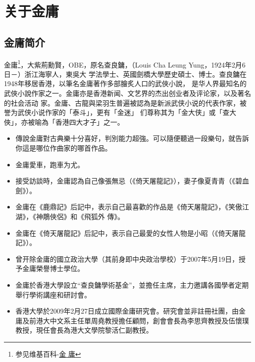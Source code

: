 \chapter{关于金庸}
\label{sec:appendixname}

\section{金庸简介}

金庸\footnote{参见维基百科-\href{http://zh.wikipedia.org/wiki/\%E9\%87\%91\%E5\%BA\%B8}{金
      庸}}，大紫荊勳賢，OBE，原名查良鏞，（Louis Cha Leung Yung，1924年2月6日－）浙江海寧人，東吳大
  学法學士、英國劍橋大學歷史碩士、博士。查良鏞在1948年移居香港，以筆名金庸著作多部膾炙人口的武俠小說，
  是华人界最知名的武俠小說作家之一。金庸亦是香港新闻、文艺界的杰出创业者及评论家，以及著名的社会活动
  家。金庸、古龍與梁羽生普遍被認為是新派武侠小说的代表作家，被誉为武侠小说作家的「泰斗」，更有「金迷」
  们尊称其为「金大侠」或「查大俠」，亦被喻為「香港四大才子」之一\cite{jinyongcn}。
\begin{itemize}
\item 傳說金庸對古典樂十分喜好，判別能力超強。可以隨便聽過一段樂句，就告訴你這是哪位作曲家的哪首作品。
\item 金庸愛車，跑車为尤。
\item 接受訪談時，金庸認為自己像張無忌（《倚天屠龍記》），妻子像夏青青（《碧血劍》）。
\item 金庸在《鹿鼎記》后記中，表示自己最喜歡的作品是《倚天屠龍記》，《笑傲江湖》，《神鵰俠侶》和《飛狐外
  傳》。
\item 金庸在《倚天屠龍記》后記中，表示自己最愛的女性人物是小昭（《倚天屠龍記》）。
\item 曾开除金庸的國立政治大學（其前身即中央政治學校）于2007年5月19日，授予金庸榮譽博士學位。
\item 金庸於香港大學設立“查良鏞學術基金”，並擔任主席，主力邀講各國學者定期舉行學術講座和研討會。
\item 香港大學於2009年2月27日成立國際金庸研究會。研究會並非註冊社團，由金庸及前港大中文系主任單周堯教授擔任顧問，創會會長為李思齊教授及伍懷璞教授，現任會長為港大文學院黎活仁副教授\cite{jinyongcn}。
\end{itemize}

\clearpage
